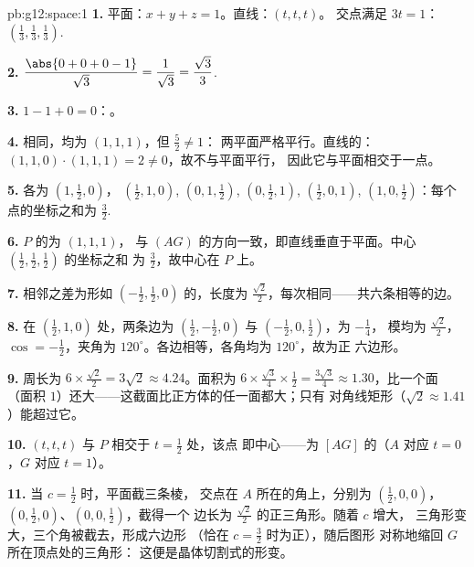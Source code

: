 \begin{solution}{pb:g12:space:1}
\textbf{1.} 平面：$x + y + z = 1$。直线：$(t, t, t)$。
交点满足 $3t = 1$：
$\left(\frac13, \frac13, \frac13\right)$.

\textbf{2.} $\dfrac{\abs{0 + 0 + 0 - 1}}{\sqrt3} =
\dfrac{1}{\sqrt3} = \dfrac{\sqrt3}{3}$.

\textbf{3.} $1 - 1 + 0 = 0$：。

\textbf{4.} 相同，均为 $(1,1,1)$，但 $\frac52 \neq 1$：
两平面严格平行。直线的：
$(1,1,0) \cdot (1,1,1) = 2 \neq 0$，故不与平面平行，
因此它与平面相交于一点。

\textbf{5.} 各为 $\left(1, \frac12, 0\right)$，
$\left(\frac12, 1, 0\right)$, $\left(0, 1, \frac12\right)$,
$\left(0, \frac12, 1\right)$, $\left(\frac12, 0, 1\right)$,
$\left(1, 0, \frac12\right)$：每个点的坐标之和为
$\frac32$.

\textbf{6.} $P$ 的为 $(1,1,1)$，
与 $(AG)$ 的方向一致，即直线垂直于平面。中心
$\left(\frac12,\frac12,\frac12\right)$ 的坐标之和
为 $\frac32$，故中心在 $P$ 上。

\textbf{7.} 相邻之差为形如
$\left(-\frac12, \frac12, 0\right)$ 的，长度为
$\frac{\sqrt2}{2}$，每次相同——共六条相等的边。

\textbf{8.} 在 $\left(\frac12, 1, 0\right)$ 处，两条边为
$\left(\frac12, -\frac12, 0\right)$ 与
$\left(-\frac12, 0, \frac12\right)$，为 $-\frac14$，
模均为 $\frac{\sqrt2}{2}$，$\cos = -\frac12$，夹角为
$120^\circ$。各边相等，各角均为 $120^\circ$，故为正
六边形。

\textbf{9.} 周长为 $6 \times \frac{\sqrt2}{2} = 3\sqrt2
\approx 4.24$。面积为 $6 \times \frac{\sqrt3}{4} \times
\frac12 = \frac{3\sqrt3}{4} \approx 1.30$，比一个面
（面积 $1$）还大——这截面比正方体的任一面都大；只有
对角线矩形（$\sqrt2 \approx 1.41$）能超过它。

\textbf{10.} $(t,t,t)$ 与 $P$ 相交于 $t = \frac12$ 处，该点
即中心——为 $[AG]$ 的（$A$ 对应 $t = 0$，$G$ 对应
$t = 1$）。

\textbf{11.} 当 $c = \frac12$ 时，平面截三条棱，
交点在 $A$ 所在的角上，分别为 $\left(\frac12,0,0\right)$，
$\left(0,\frac12,0\right)$、$\left(0,0,\frac12\right)$，截得一个
边长为 $\frac{\sqrt2}{2}$ 的正三角形。随着 $c$ 增大，
三角形变大，三个角被截去，形成六边形
（恰在 $c = \frac32$ 时为正），随后图形
对称地缩回 $G$ 所在顶点处的三角形：
这便是晶体切割式的形变。


\end{solution}

